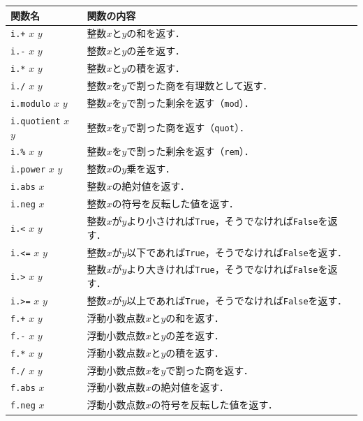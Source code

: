 \begin{table}[h]
  \begin{center}
    \begin{tabular}{ | l | p{9cm} |}
    \hline
    関数名 & 関数の内容 \\ \hline
    \texttt{i.+} $x$ $y$ & 整数$x$と$y$の和を返す． \\ \hline
    \texttt{i.-} $x$ $y$ & 整数$x$と$y$の差を返す． \\ \hline
    \texttt{i.*} $x$ $y$ & 整数$x$と$y$の積を返す． \\ \hline
    \texttt{i./} $x$ $y$ & 整数$x$を$y$で割った商を有理数として返す． \\ \hline
    \texttt{i.modulo} $x$ $y$ & 整数$x$を$y$で割った剰余を返す（\texttt{mod}）． \\ \hline
    \texttt{i.quotient} $x$ $y$ & 整数$x$を$y$で割った商を返す（\texttt{quot}）． \\ \hline
    \texttt{i.\%} $x$ $y$ & 整数$x$を$y$で割った剰余を返す（\texttt{rem}）． \\ \hline
    \texttt{i.power} $x$ $y$ & 整数$x$の$y$乗を返す． \\ \hline
    \texttt{i.abs} $x$ & 整数$x$の絶対値を返す． \\ \hline
    \texttt{i.neg} $x$ & 整数$x$の符号を反転した値を返す． \\ \hline
    \texttt{i.<} $x$ $y$ & 整数$x$が$y$より小さければ\texttt{True}，そうでなければ\texttt{False}を返す． \\ \hline
    \texttt{i.<=} $x$ $y$ & 整数$x$が$y$以下であれば\texttt{True}，そうでなければ\texttt{False}を返す． \\ \hline
    \texttt{i.>} $x$ $y$ & 整数$x$が$y$より大きければ\texttt{True}，そうでなければ\texttt{False}を返す． \\ \hline
    \texttt{i.>=} $x$ $y$ & 整数$x$が$y$以上であれば\texttt{True}，そうでなければ\texttt{False}を返す． \\ \hline
    \texttt{f.+} $x$ $y$ & 浮動小数点数$x$と$y$の和を返す． \\ \hline
    \texttt{f.-} $x$ $y$ & 浮動小数点数$x$と$y$の差を返す． \\ \hline
    \texttt{f.*} $x$ $y$ & 浮動小数点数$x$と$y$の積を返す． \\ \hline
    \texttt{f./} $x$ $y$ & 浮動小数点数$x$を$y$で割った商を返す． \\ \hline
    \texttt{f.abs} $x$ & 浮動小数点数$x$の絶対値を返す． \\ \hline
    \texttt{f.neg} $x$ & 浮動小数点数$x$の符号を反転した値を返す． \\ \hline

\end{tabular}
\end{center}
\end{table}
